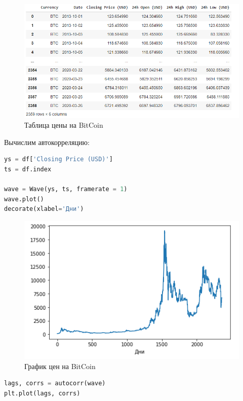 \begin{figure}[H]
	\begin{center}
		\includegraphics[scale=1]{fig/lab05/lab05_05.png}
		\caption{Таблица цены на BitCoin}
	\end{center}
\end{figure}

Вычислим автокорреляцию:

\begin{lstlisting}[language=Python]
ys = df['Closing Price (USD)']
ts = df.index

wave = Wave(ys, ts, framerate = 1)
wave.plot()
decorate(xlabel='Дни')
\end{lstlisting}

\begin{figure}[H]
	\begin{center}
		\includegraphics[scale=1]{fig/lab05/lab05_06.png}
		\caption{График цен на BitCoin}
	\end{center}
\end{figure}

\begin{lstlisting}[language=Python]
lags, corrs = autocorr(wave)
plt.plot(lags, corrs)
\end{lstlisting}

